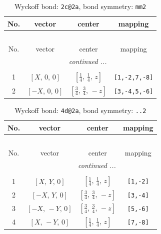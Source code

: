 \documentclass[fleqn,8pt]{jsarticle}
\begin{document}
\renewcommand{\arraystretch}{1.2}
\begin{longtable}{cccc}
\caption{Wyckoff bond: {\tt 2c@2a}, bond symmetry: {\tt mm2}}
 \\
 \hline \hline
No. & vector & center & mapping \\ \hline \endfirsthead

\multicolumn{3}{l}{\tablename\ \thetable{}} \\
 \hline \hline
No. & vector & center & mapping \\ \hline \endhead

 \hline \hline
\multicolumn{3}{r}{\footnotesize\it continued ...} \\ \endfoot

 \hline \hline
\multicolumn{3}{r}{} \\ \endlastfoot

1 & $\left[ X,\, 0,\, 0 \right]$ & $\left[ \frac{1}{4},\, \frac{1}{4},\, z \right]$ & {\tt [1,-2,7,-8]} \\ \hline
2 & $\left[ - X,\, 0,\, 0 \right]$ & $\left[ \frac{3}{4},\, \frac{3}{4},\, - z \right]$ & {\tt [3,-4,5,-6]} \\
\end{longtable}
\renewcommand{\arraystretch}{1.2}
\begin{longtable}{cccc}
\caption{Wyckoff bond: {\tt 4d@2a}, bond symmetry: {\tt ..2}}
 \\
 \hline \hline
No. & vector & center & mapping \\ \hline \endfirsthead

\multicolumn{3}{l}{\tablename\ \thetable{}} \\
 \hline \hline
No. & vector & center & mapping \\ \hline \endhead

 \hline \hline
\multicolumn{3}{r}{\footnotesize\it continued ...} \\ \endfoot

 \hline \hline
\multicolumn{3}{r}{} \\ \endlastfoot

1 & $\left[ X,\, Y,\, 0 \right]$ & $\left[ \frac{1}{4},\, \frac{1}{4},\, z \right]$ & {\tt [1,-2]} \\ \hline
2 & $\left[ - X,\, Y,\, 0 \right]$ & $\left[ \frac{3}{4},\, \frac{3}{4},\, - z \right]$ & {\tt [3,-4]} \\ \hline
3 & $\left[ - X,\, - Y,\, 0 \right]$ & $\left[ \frac{3}{4},\, \frac{3}{4},\, - z \right]$ & {\tt [5,-6]} \\ \hline
4 & $\left[ X,\, - Y,\, 0 \right]$ & $\left[ \frac{1}{4},\, \frac{1}{4},\, z \right]$ & {\tt [7,-8]} \\
\end{longtable}
\end{document}

